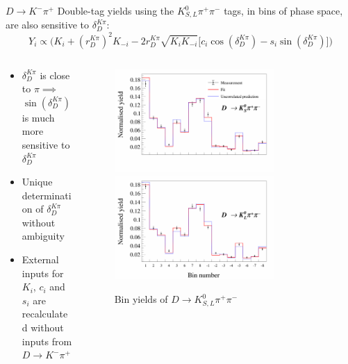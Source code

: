 \documentclass{beamer}
\begin{document}
\begin{frame}{$D\to K^-\pi^+$}
  \vspace{0.0cm}
  {\large Double-tag yields using the $K_{S, L}^0\pi^+\pi^-$ tags, in bins of phase space, are also sensitive to $\delta_D^{K\pi}$:}
  \begin{equation*}
    Y_i\propto\Big(K_i + (r_D^{K\pi})^2K_{-i} - 2r_D^{K\pi}\sqrt{K_iK_{-i}}\Big[c_i\cos(\delta_D^{K\pi}) - s_i\sin(\delta_D^{K\pi})\Big]\Big)
  \end{equation*}
  \vspace{-0.7cm}
  \begin{columns}
    \begin{column}{0.5\textwidth}
      \begin{itemize}
      \setlength{\itemsep}{1.0em}
      \item{$\delta_D^{K\pi}$ is close to $\pi\implies$ $\sin(\delta_D^{K\pi})$ is much more sensitive to $\delta_D^{K\pi}$}
      \item{Unique determination of $\delta_D^{K\pi}$ without ambiguity}
      \item{External inputs for $K_i$, $c_i$ and $s_i$ are recalculated without inputs from $D\to K^-\pi^+$}
      \end{itemize}
    \end{column}
    \begin{column}{0.5\textwidth}
      \begin{figure}
        \includegraphics[width=0.75\textwidth,trim={0 5.8cm 0 0},clip=true]{Figures/KSpipiVersusKpiYields.pdf}
        \includegraphics[width=0.75\textwidth,trim={0 0 0 2.0cm},clip=true]{Figures/KLpipiVersusKpiYields.pdf}
        \caption*{Bin yields of $D\to K_{S, L}^0\pi^+\pi^-$}
      \end{figure}
    \end{column}
  \end{columns}  
\end{frame}
\end{document}

